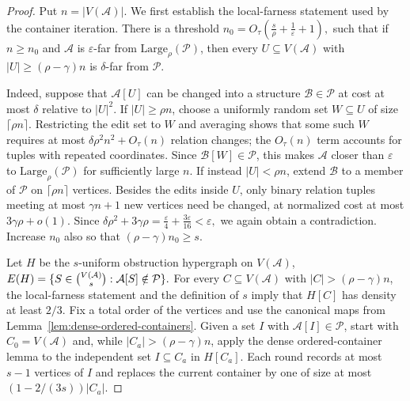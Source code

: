 \documentclass[11pt,reqno,letterpaper]{amsart}
\newcommand{\cA}{{\mathcal A}}
\newcommand{\cB}{{\mathcal B}}
\newcommand{\cP}{{\mathcal P}}
\theoremstyle{plain}
\theoremstyle{remark}
\begin{document}
\begin{proof}
Put $n=|V(\cA)|$.  We first establish the local-farness statement used by the
container iteration.  There is a threshold
\(n_0=O_\tau\!\left(\frac{s}{\rho}+\frac1\varepsilon+1\right),\)
such that if $n\geq n_0$ and $\cA$ is $\varepsilon$-far from
$\mathrm{Large}_\rho(\cP)$, then every
$U\subseteq V(\cA)$ with $|U|\geq(\rho-\gamma)n$ is $\delta$-far from
$\cP$.

Indeed, suppose that $\cA[U]$ can be changed into a structure
$\cB\in\cP$ at cost at most $\delta$ relative to $|U|^2$.  If
$|U|\geq\rho n$, choose a uniformly random set
$W\subseteq U$ of size $\lceil\rho n\rceil$.  Restricting the edit set to
$W$ and averaging shows that some such $W$ requires at most
\(\delta\rho^2n^2+O_\tau(n)\)
relation changes; the $O_\tau(n)$ term accounts for tuples with repeated
coordinates.  Since $\cB[W]\in\cP$, this makes $\cA$ closer than
$\varepsilon$ to $\mathrm{Large}_\rho(\cP)$ for sufficiently large $n$.
If instead $|U|<\rho n$, extend $\cB$ to a member of $\cP$ on
$\lceil\rho n\rceil$ vertices.  Besides the edits inside $U$, only binary
relation tuples meeting at most $\gamma n+1$ new vertices need be changed, at
normalized cost at most $3\gamma\rho+o(1)$.  Since
\(\delta\rho^2+3\gamma\rho =\frac{\varepsilon}{4}+\frac{3\varepsilon}{16} <\varepsilon,\)
we again obtain a contradiction.  Increase $n_0$ also so that
$(\rho-\gamma)n_0\geq s$.

Let $H$ be the $s$-uniform obstruction hypergraph on $V(\cA)$,
\(E(H)=\{S\in\tbinom{V(\cA)}s:\cA[S]\notin\cP\}.\)
For every $C\subseteq V(\cA)$ with $|C|>(\rho-\gamma)n$, the local-farness
statement and the definition of $s$ imply that $H[C]$ has density at least
$2/3$.  Fix a total order of the vertices and use the canonical maps from
Lemma~\ref{lem:dense-ordered-containers}.  Given a set $I$ with
$\cA[I]\in\cP$, start with $C_0=V(\cA)$ and, while
$|C_a|>(\rho-\gamma)n$, apply the dense ordered-container lemma to the
independent set $I\subseteq C_a$ in $H[C_a]$.  Each round records at most
$s-1$ vertices of $I$ and replaces the current container by one of size at
most $(1-2/(3s))|C_a|$.


\end{proof}
\end{document}
